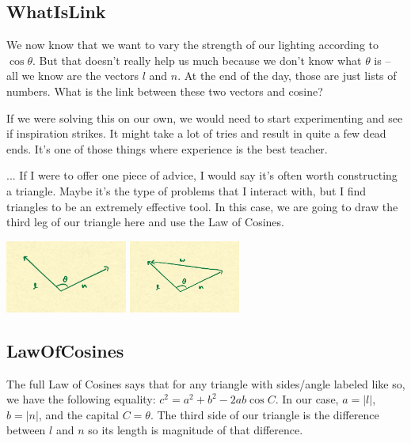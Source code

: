 \documentclass{article}
\begin{document}
\subsection{WhatIsLink}

We now know that we want to vary the strength of our lighting according to $\cos \theta$.
But that doesn't really help us much because we don't know what $\theta$ is -- all we know are the vectors $l$ and $n$.
At the end of the day, those are just lists of numbers.
What is the link between these two vectors and cosine?

If we were solving this on our own, we would need to start experimenting and see if inspiration strikes.
It might take a lot of tries and result in quite a few dead ends.
It's one of those things where experience is the best teacher.

... If I were to offer one piece of advice, I would say it's often worth constructing a triangle.
Maybe it's the type of problems that I interact with, but I find triangles to be an extremely effective tool.
In this case, we are going to draw the third leg of our triangle here and use the Law of Cosines.

\begin{center}
	\includegraphics[width=0.3\textwidth,frame]{assets/ln.jpg}
	\hspace{0.2\textwidth}
	\includegraphics[width=0.2735\textwidth,frame]{assets/lnw.jpg}
\end{center}

\subsection{LawOfCosines}

The full Law of Cosines says that for any triangle with sides/angle labeled like so, we have the following equality: $c^2 = a^2 + b^2 - 2ab \cos C$.
In our case, $a = |l|$, $b = |n|$, and the capital $C = \theta$.
The third side of our triangle is the difference between $l$ and $n$ so its length is magnitude of that difference.
\end{document}
